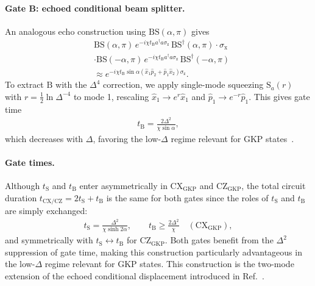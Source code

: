 \documentclass[aps,prx,showpacs,notitlepage,twocolumn,superscriptaddress,nofootinbib,preprintnumbers,floatfix,10pt, longbibliography]{revtex4-2}
\begin{document}
{\paragraph{Gate B: echoed conditional beam splitter.}
An analogous echo construction using $\mathrm{BS}(\alpha,\pi)$ gives
\begin{align}
  &\mathrm{BS}(\alpha,\pi)\,e^{-i\chi t_\mathrm{B}a^\dagger a\sigma_\mathrm{z}}\,
    \mathrm{BS}^\dagger(\alpha,\pi)\cdot\sigma_\mathrm{x}\nonumber\\
  &\cdot\mathrm{BS}(-\alpha,\pi)\,e^{-i\chi t_\mathrm{B}a^\dagger a\sigma_\mathrm{z}}\,
    \mathrm{BS}^\dagger(-\alpha,\pi)\nonumber\\
  &\approx e^{-i\chi t_\mathrm{B}\sin\alpha(\hat{x}_1\hat{p}_2
             +\hat{p}_1\hat{x}_2)\sigma_\mathrm{z}}.
  \label{eq:Echoed-BS}
\end{align}
To extract $\mathrm{B}$ with the $\Delta^4$ correction, we apply
single-mode squeezing $\mathrm{S}_a(r)$ with $r=\frac{1}{2}\ln\Delta^{-4}$
to mode 1, rescaling $\hat{x}_1\to e^r\hat{x}_1$ and
$\hat{p}_1\to e^{-r}\hat{p}_1$.  This gives gate time
\begin{align}
  t_\mathrm{B} = \frac{2\Delta^2}{\chi\sin\alpha},
\end{align}
which decreases with $\Delta$, favoring the low-$\Delta$ regime relevant
for GKP states~\cite{eickbusch2022fast}.

\paragraph{Gate times.}
Although $t_\mathrm{S}$ and $t_\mathrm{B}$ enter asymmetrically in 
$\mathrm{CX}_\mathrm{GKP}$ and $\mathrm{CZ}_\mathrm{GKP}$, the total 
circuit duration $t_\mathrm{CX/CZ}=2t_\mathrm{S}+t_\mathrm{B}$ is the 
same for both gates since the roles of $t_\mathrm{S}$ and $t_\mathrm{B}$ 
are simply exchanged:
\begin{align}
  t_\mathrm{S} = \frac{\Delta^2}{\chi\sinh 2\alpha}, \qquad
  t_\mathrm{B} \ge \frac{2\Delta^2}{\chi}
  \quad (\mathrm{CX}_\mathrm{GKP}),
\end{align}
and symmetrically with $t_\mathrm{S}\leftrightarrow t_\mathrm{B}$ for
$\mathrm{CZ}_\mathrm{GKP}$. Both gates benefit from the $\Delta^2$ 
suppression of gate time, making this construction particularly 
advantageous in the low-$\Delta$ regime relevant for GKP states. This 
construction is the two-mode extension of the echoed conditional 
displacement introduced in Ref.~\cite{ISA}.

}
\end{document}
